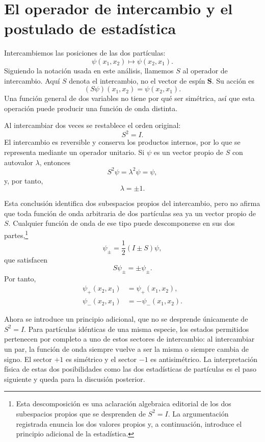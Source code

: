 \section{El operador de intercambio y el postulado de estadística}

Intercambiemos las posiciones de las dos partículas:
\begin{equation}
\psi(x_{1},x_{2})\longmapsto\psi(x_{2},x_{1}).
\end{equation}
Siguiendo la notación usada en este análisis, llamemos \(S\) al operador de intercambio. Aquí \(S\) denota el intercambio, no el vector de espín \(\mathbf S\). Su acción es
\begin{equation}
(S\psi)(x_{1},x_{2})=\psi(x_{2},x_{1}).
\end{equation}
Una función general de dos variables no tiene por qué ser simétrica, así que esta operación puede producir una función de onda distinta.

Al intercambiar dos veces se restablece el orden original:
\begin{equation}
S^{2}=I.
\end{equation}
El intercambio es reversible y conserva los productos internos, por lo que se representa mediante un operador unitario. Si \(\psi\) es un vector propio de \(S\) con autovalor \(\lambda\), entonces
\[
S^{2}\psi=\lambda^{2}\psi=\psi,
\]
y, por tanto,
\begin{equation}
\lambda=\pm1.
\end{equation}

Esta conclusión identifica dos subespacios propios del intercambio, pero no afirma que toda función de onda arbitraria de dos partículas sea ya un vector propio de \(S\). Cualquier función de onda de ese tipo puede descomponerse en sus dos partes,\footnote{Esta descomposición es una aclaración algebraica editorial de los dos subespacios propios que se desprenden de \(S^{2}=I\). La argumentación registrada enuncia los dos valores propios y, a continuación, introduce el principio adicional de la estadística.}
\begin{equation}
\psi_{\pm}=\frac12(I\pm S)\psi,
\end{equation}
que satisfacen
\begin{equation}
S\psi_{\pm}=\pm\psi_{\pm}.
\end{equation}
Por tanto,
\begin{align}
\psi_{+}(x_{2},x_{1})&=\psi_{+}(x_{1},x_{2}),\\
\psi_{-}(x_{2},x_{1})&=-\psi_{-}(x_{1},x_{2}).
\end{align}

Ahora se introduce un principio adicional, que no se desprende únicamente de \(S^{2}=I\). Para partículas idénticas de una misma especie, los estados permitidos pertenecen por completo a uno de estos sectores de intercambio: al intercambiar un par, la función de onda siempre vuelve a ser la misma o siempre cambia de signo. El sector \(+1\) es simétrico y el sector \(-1\) es antisimétrico. La interpretación física de estas dos posibilidades como las dos estadísticas de partículas es el paso siguiente y queda para la discusión posterior.
